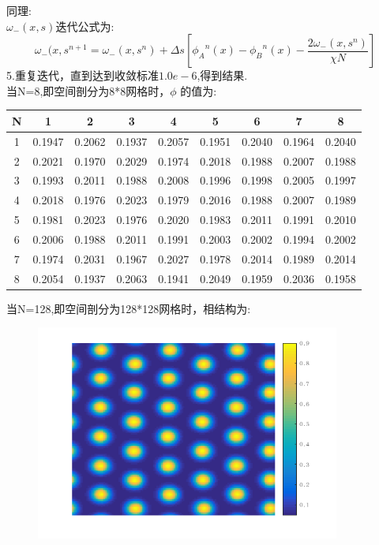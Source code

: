 \documentclass[12pt]{article}
\begin{document}
\begin{CJK}{UTF8}{gkai}
     同理:\\
     
     $\omega_-(x,s)$迭代公式为:\\
     $$\omega_-(x,s^{n+1}=\omega_-(x,s^n)+\Delta s[{\phi _A}^n(x)-{\phi _B}^n(x)-\frac{2\omega_-(x,s^n)}{\chi N}]$$
     5.重复迭代，直到达到收敛标准$1.0e-6$,得到结果.\\
     
    当N=8,即空间剖分为8*8网格时，$\phi$ 的值为:
    \begin{table}[H]
    	\centering
    	\begin{tabular}{ccccccccc}
    		
    		\toprule
    		N&1& 2  &3&4&5&6&7&8\\
    		\midrule    
    		1&0.1947&	0.2062&	0.1937&	0.2057&	0.1951&	0.2040&	0.1964&	0.2040\\
    		2&0.2021&	0.1970&	0.2029&	0.1974&	0.2018&	0.1988&	0.2007&	0.1988\\
    		3&0.1993&	0.2011&	0.1988&	0.2008&	0.1996&	0.1998&	0.2005&	0.1997\\
    		4&0.2018&	0.1976&	0.2023&	0.1979&	0.2016&	0.1988&	0.2007&	0.1989\\
    		5&0.1981&	0.2023&	0.1976&	0.2020&	0.1983&	0.2011&	0.1991&	0.2010\\
    		6&0.2006&	0.1988&	0.2011&	0.1991&	0.2003&	0.2002&	0.1994&	0.2002\\
    		7&0.1974&	0.2031&	0.1967 &	0.2027&	0.1978&	0.2014&	0.1989&	0.2014\\
    		8&0.2054&	0.1937&	0.2063&	0.1941&	0.2049&	0.1959&	0.2036&	0.1958\\
    		\bottomrule
    	\end{tabular}
    \end{table} 
    当N=128,即空间剖分为128*128网格时，相结构为:\\
    \begin{figure}[H] 
    	\centering
    	\includegraphics[width=10cm]{p.png}

\end{figure}
\end{CJK}
\end{document}

